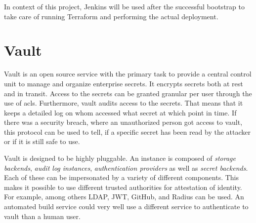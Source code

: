In context of this project, Jenkins will be used after the successful bootstrap to take care of running Terraform and performing the actual deployment.

    

\section{Vault}
\label{sec:vault}
Vault is an open source service with the primary task to provide a central control unit to manage and organize enterprise secrets.
It encrypts secrets both at rest and in transit.
Access to the secrets can be granted granular per user through the use of \acp{acl}.
Furthermore, vault audits access to the secrets.
That means that it keeps a detailed log on whom accessed what secret at which point in time.
If there was a security breach, where an unauthorized person got access to vault, this protocol can be used to tell, if a specific secret has been read by the attacker or if it is still safe to use.

Vault is designed to be highly pluggable.
An instance is composed of \emph{storage backends}, \emph{audit log instances}, \emph{authentication providers} as well as \emph{secret backends}.
Each of these can be impersonated by a variety of different components.
This makes it possible to use different trusted authorities for attestation of identity.
For example, among others LDAP, JWT, GitHub, and Radius can be used.
An automated build service could very well use a different service to authenticate to vault than a human user.

